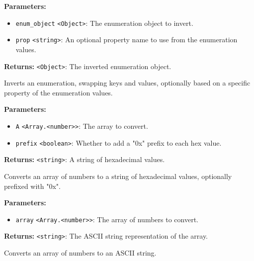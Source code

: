 \documentclass[12pt,a4paper]{article}
\begin{document}
\noindent \textbf{Parameters:}
\begin{itemize}
  \item \texttt{enum\_object} \texttt{<Object>}: The enumeration object to invert.
  \item \texttt{prop} \texttt{<string>}: An optional property name to use from the enumeration values.
\end{itemize}

\noindent \textbf{Returns:} \texttt{<Object>}: The inverted enumeration object.

\noindent Inverts an enumeration, swapping keys and values, optionally based on a specific property of the enumeration values.

\vspace{5mm}
\noindent {}


\noindent \textbf{Parameters:}
\begin{itemize}
  \item \texttt{A} \texttt{<Array.<number>>}: The array to convert.
  \item \texttt{prefix} \texttt{<boolean>}: Whether to add a "0x" prefix to each hex value.
\end{itemize}

\noindent \textbf{Returns:} \texttt{<string>}: A string of hexadecimal values.

\noindent Converts an array of numbers to a string of hexadecimal values, optionally prefixed with "0x".

\vspace{5mm}
\noindent {}


\noindent \textbf{Parameters:}
\begin{itemize}
  \item \texttt{array} \texttt{<Array.<number>>}: The array of numbers to convert.
\end{itemize}

\noindent \textbf{Returns:} \texttt{<string>}: The ASCII string representation of the array.

\noindent Converts an array of numbers to an ASCII string.

\vspace{5mm}
\noindent {}
\end{document}

